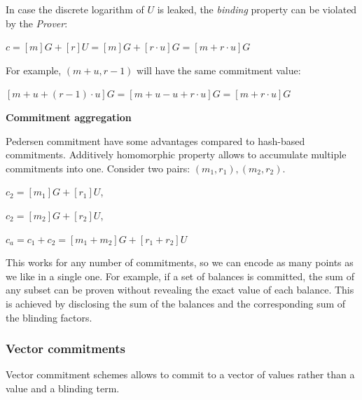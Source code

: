 \documentclass[../lecture-notes.tex]{subfiles}
\begin{document}
\begin{remark}
    In case the discrete logarithm of $U$ is leaked, the \textit{binding} property can be violated by the \textit{Prover}:

    \begin{center}
        $c = [m]G + [r]U = [m] G + [r \cdot u]G = [m + r \cdot u] G$
    \end{center}

    For example, $(m + u, r - 1)$ will have the same commitment value:

    \begin{center}
        $[m+u + (r-1) \cdot u] G = [m + u - u + r \cdot u] G = [m + r \cdot u] G$     
    \end{center}
    
        
\end{remark}

\vspace{0.5 cm}

\textbf{Commitment aggregation}

Pedersen commitment have some advantages compared to hash-based commitments.
Additively homomorphic property allows to accumulate multiple commitments into one.
Consider two pairs: $(m_1, r_1), (m_2, r_2)$.

\begin{center}
    $c_2 = [m_1]G + [r_1]U$,

    $c_2 = [m_2]G + [r_2]U$,

    $c_a = c_1 + c_2 = [m_1 + m_2]G + [r_1 + r_2]U$
\end{center}

This works for any number of commitments, so we can encode as many points as we like in a single one.
For example, if a set of balances is committed, the sum of any subset can be proven without revealing the exact value of each balance. 
This is achieved by disclosing the sum of the balances and the corresponding sum of the blinding factors.

\vspace{0.5 cm}

\subsubsection{Vector commitments}

Vector commitment schemes allows to commit to a vector of values rather than a value and a blinding term.

\vspace{0.5 cm}
\end{document}
